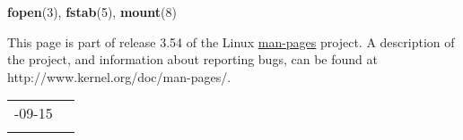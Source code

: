 \documentclass[]{article}
\let\realtextbf=\textbf
\renewcommand{\textbf}[1]{\textcolor{boldcolor}{\realtextbf{#1}}}
\renewcommand{\emph}[1]{\underline{#1}}
\begin{document}
\textbf{fopen}(3), \textbf{fstab}(5), \textbf{mount}(8)


This page is part of release 3.54 of the Linux \emph{man-pages} project.
A description of the project, and information about reporting bugs, can
be found at http://www.kernel.org/doc/man-pages/.

\begin{longtable}[c]{@{}ll@{}}
\toprule\addlinespace
2009-09-15 &
\\\addlinespace
\bottomrule
\end{longtable}
\end{document}
